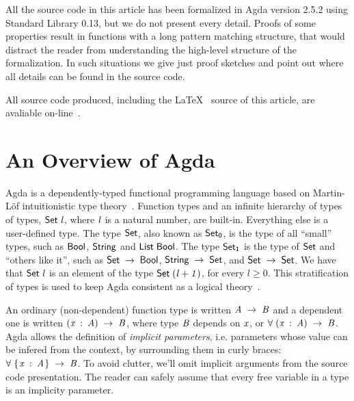 \documentclass[sigconf]{acmart}
\renewcommand{\geq}{\geqslant}
\theoremstyle{definition}
\newcommand{\D}[1]{\blue{\mathsf{#1}}}
\newcommand{\V}[1]{\purple{\mathit{#1}}}
\begin{document}
All the source code in this article has been formalized in Agda
version 2.5.2 using Standard Library 0.13, but
we do not present every detail. Proofs of some properties result in
functions with a long pattern matching structure, that would distract
the reader from understanding the high-level structure of the
formalization. In such situations we give just proof sketches and point
out where all details can be found in the source code.

All source code produced, including
the \LaTeX~ source of this article, are avaliable
on-line~\cite{regex-rep}.


\section{An Overview of Agda}\label{sec:agda}

Agda is a dependently-typed functional programming language based on
Martin-L\"of intuitionistic type theory~\cite{Lof98}.  Function types
and an infinite hierarchy of types of types, \ensuremath{\D{Set}\;\V{l}}, where \ensuremath{\V{l}} is a
natural number, are built-in. Everything else is a user-defined
type. The type \ensuremath{\D{Set}}, also known as \ensuremath{\D{Set}_{\D{0}}}, is the type of all
``small'' types, such as \ensuremath{\D{Bool}}, \ensuremath{\D{String}} and \ensuremath{\D{List}\;\D{Bool}}.  The type
\ensuremath{\D{Set}_{\D{1}}} is the type of \ensuremath{\D{Set}} and ``others like it'', such as \ensuremath{\D{Set}\;\to \;\D{Bool}}, \ensuremath{\D{String}\;\to \;\D{Set}}, and \ensuremath{\D{Set}\;\to \;\D{Set}}. We have that \ensuremath{\D{Set}\;\V{l}} is an
element of the type \ensuremath{\D{Set}\;(\V{l+1})}, for every $l \geq 0$. This
stratification of types is used to keep Agda consistent as a logical
theory~\cite{Sorensen2006}.

An ordinary (non-dependent) function type is written \ensuremath{\V{A}\;\to \;\V{B}} and a
dependent one is written \ensuremath{(\V{x}\;\mathbin{:}\;\V{A})\;\to \;\V{B}}, where type \ensuremath{\V{B}} depends on
\ensuremath{\V{x}}, or \ensuremath{\D{\forall}\;(\V{x}\;\mathbin{:}\;\V{A})\;\to \;\V{B}}. Agda allows the definition of \emph{implicit
parameters}, i.e.  parameters whose value can be infered from the
context, by surrounding them in curly braces: \ensuremath{\D{\forall}\;\{\mskip1.5mu \V{x}\;\mathbin{:}\;\V{A}\mskip1.5mu\}\;\to \;\V{B}}. To
avoid clutter, we'll omit implicit arguments from the source code
presentation. The reader can safely assume that every free variable in
a type is an implicity parameter.
\end{document}
